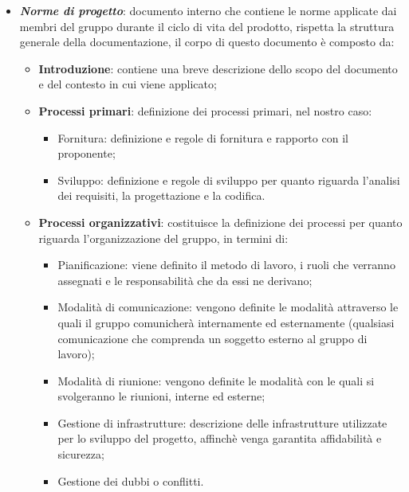 \begin{itemize}
        \item \textit{\textbf{Norme di progetto}}: documento interno che contiene le norme applicate dai membri del gruppo durante il ciclo di vita del prodotto, rispetta la struttura generale della documentazione, il corpo di questo documento è composto da:
        \begin{itemize}
            \item \textbf{Introduzione}: contiene una breve descrizione dello scopo del documento e del contesto in cui viene applicato;    
            \item \textbf{Processi primari}: definizione dei processi primari, nel nostro caso:
            \begin{itemize}
                \item Fornitura: definizione e regole di fornitura e rapporto con il proponente;
                \item Sviluppo: definizione e regole di sviluppo per quanto riguarda l'analisi dei requisiti, la progettazione e la codifica.
            \end{itemize}
            \item \textbf{Processi organizzativi}: costituisce la definizione dei processi per quanto riguarda l'organizzazione del gruppo, in termini di:
            \begin{itemize}
                \item Pianificazione: viene definito il metodo di lavoro, i ruoli che verranno assegnati e le responsabilità che da essi ne derivano;
                \item Modalità di comunicazione: vengono definite le modalità attraverso le quali il gruppo comunicherà internamente ed esternamente (qualsiasi comunicazione che comprenda un soggetto esterno al gruppo di lavoro);
                \item Modalità di riunione: vengono definite le modalità con le quali si svolgeranno le riunioni, interne ed esterne;
                \item Gestione di infrastrutture: descrizione delle infrastrutture utilizzate per lo sviluppo del progetto, affinchè venga garantita affidabilità e sicurezza;
                \item Gestione dei dubbi o conflitti.
            \end{itemize}


\end{itemize}
\end{itemize}
